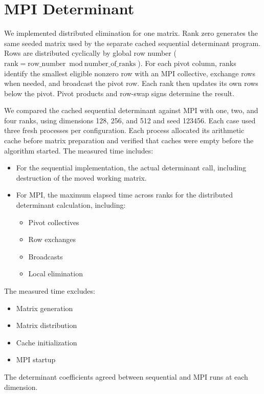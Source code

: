 \section{MPI Determinant}
\label{sec:mpi-determinant}
We implemented distributed elimination for one matrix.
Rank zero generates the same seeded matrix used by the separate
cached sequential determinant program. Rows are distributed cyclically by
global row number ($\text{rank} = \text{row\_number} \bmod \text{number\_of\_ranks}$). 
For each pivot column, ranks identify the smallest eligible
nonzero row with an MPI collective, exchange rows when needed, and broadcast
the pivot row. Each rank then updates its own rows below the pivot. Pivot
products and row-swap signs determine the result.

We compared the cached sequential determinant against MPI with one, two, and
four ranks, using dimensions 128, 256, and 512 and seed 123456. Each case used
three fresh processes per configuration. Each process allocated its arithmetic
cache before matrix preparation and verified that caches were empty before the algorithm started.
The measured time includes:
\begin{itemize}
    \item For the sequential implementation, the actual determinant call,
    including destruction of the moved working matrix.
    \item For MPI, the maximum elapsed time across ranks for the distributed
    determinant calculation, including:
    \begin{itemize}
        \item Pivot collectives
        \item Row exchanges
        \item Broadcasts
        \item Local elimination
    \end{itemize}
\end{itemize}

The measured time excludes:
\begin{itemize}
    \item Matrix generation
    \item Matrix distribution
    \item Cache initialization
    \item MPI startup
\end{itemize}

The determinant coefficients agreed between sequential and MPI runs at each
dimension.

